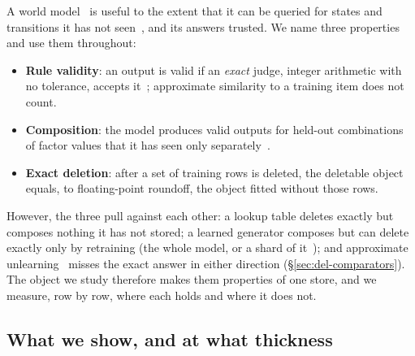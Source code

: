 \documentclass{article} %
\begin{document}
A world model~\citep{ha2018world,hafner2019dream,hafner2025mastering,schrittwieser2020mastering} is useful to the extent that it can be queried for states and transitions it has
not seen~\citep{micheli2023transformers,alonso2024diffusion,valevski2025diffusion,bruce2024genie}, and its answers trusted. We name three properties and use them throughout:
\begin{itemize}[leftmargin=*,nosep]
\item \textbf{Rule validity}: an output is valid if an \emph{exact} judge, integer arithmetic
  with no tolerance, accepts it~\citep{vafa2024evaluating}; approximate similarity to a training item does not count.
\item \textbf{Composition}: the model produces valid outputs for held-out combinations of
  factor values that it has seen only separately~\citep{kipf2020contrastive,zhao2022toward}.
\item \textbf{Exact deletion}: after a set of training rows is deleted, the deletable object
  equals, to floating-point roundoff, the object fitted without those rows.
\end{itemize}
However, the three pull against each other: a lookup table deletes exactly but
composes nothing it has not stored; a learned generator composes but can delete exactly only by
retraining (the whole model, or a shard of it~\citep{bourtoule2021machine}); and approximate unlearning~\citep{guo2020certified,izzo2021approximate,golatkar2020eternal} misses the exact answer in either direction
(\S\ref{sec:del-comparators}). The object we study therefore makes them properties of one store, and we measure, row by row, where each holds and where it does not.

\subsection{What we show, and at what thickness}
\label{sec:contrib}
\end{document}
